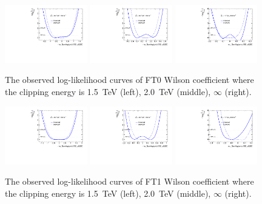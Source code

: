 \begin{figure}[ht]
    \centering
    \includegraphics[width=0.32\textwidth]{figures/aQGC/profileFT01500}
    	\includegraphics[width=0.32\textwidth]{figures/aQGC/profileFT02000}
        \includegraphics[width=0.32\textwidth]{figures/aQGC/profileFT0inf}
        \caption{The observed log-likelihood curves of FT0 Wilson coefficient where the clipping energy is 1.5~TeV (left), 2.0~TeV (middle), $\infty$ (right).}
        \label{fig:ProfileLL}
\end{figure}
\begin{figure}[ht]
    \centering
    \includegraphics[width=0.32\textwidth]{figures/aQGC/profileFT11500}
    	\includegraphics[width=0.32\textwidth]{figures/aQGC/profileFT12000}
        \includegraphics[width=0.32\textwidth]{figures/aQGC/profileFT1inf}
        \caption{The observed log-likelihood curves of FT1 Wilson coefficient where the clipping energy is 1.5~TeV (left), 2.0~TeV (middle), $\infty$ (right).}
        \label{fig:ProfileLL}
\end{figure}
